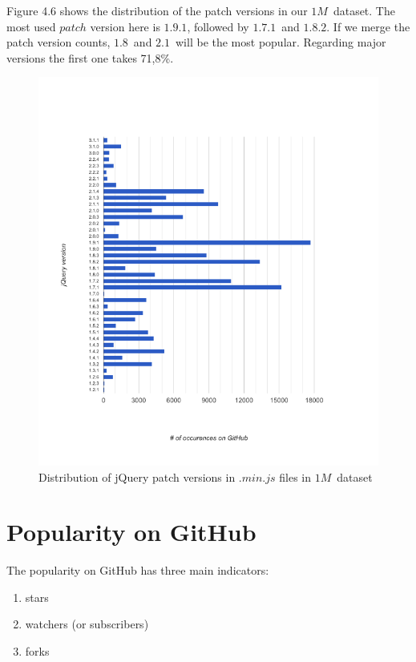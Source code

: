 \documentclass[thesis=M,english]{FITthesis}[2012/10/20]
\begin{document}
Figure 4.6 shows the distribution of the patch versions in our $1M$ dataset. The most used $patch$ version here is $1.9.1$, followed by $1.7.1$ and $1.8.2$. If we merge the patch version counts, $1.8$ and $2.1$ will be the most popular. Regarding major versions the first one takes 71,8\%.

\begin{center}
\begin{figure}[ht]
	\includegraphics[trim=4cm 0cm 3cm 2.5cm, totalheight=530pt]{images/jquery_nm_patch.png}
	\caption{Distribution of jQuery patch versions in $.min.js$ files in $1M$ dataset}
	\label{fig: jquery_nm_patch}
\end{figure}
\end{center}

\section{Popularity on GitHub}

The popularity on GitHub has three main indicators:

\begin{enumerate}
\item stars
\item watchers (or subscribers)
\item forks
\end{enumerate}
\end{document}
